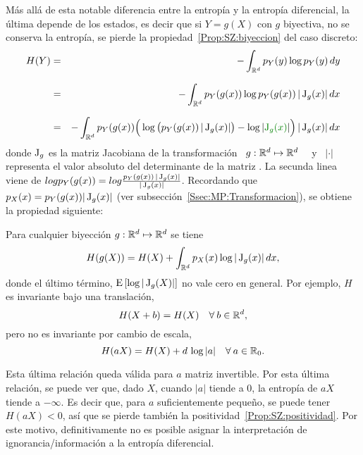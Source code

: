 M\'as  all\'a de esta  notable diferencia  entre la  entrop\'ia y  la entrop\'ia
diferencial, la \'ultima depende de los estados,  es decir que si $Y = g(X)$ con
$g$   biyectiva,   no   se   conserva   la  entrop\'ia,   \ie   se   pierde   la
propiedad~\ref{Prop:SZ:biyeccion} del caso discreto:
%
\begin{eqnarray*}
H(Y) & = & - \int_{\Rset^d} p_Y(y) \log p_Y(y) \, dy\\[2.5mm]
%
& = &  - \int_{\Rset^d} p_Y(g(x)) \log p_Y(g(x)) \, |\Jac_g(x)| \, dx\\[2.5mm]
%
& = & - \int_{\Rset^d} p_Y(g(x)) \Big( \log \big( p_Y(g(x)) \, |\Jac_g(x)| \big) -
\log |\modif{\Jac_g(x)}| \Big) \, |\Jac_g(x)| \, dx
\end{eqnarray*}
%
donde   $\operatorname{J}_g$   es   la   matriz   Jacobiana   de   la   transformaci\'on   \
$g: \mathbb{R}^d \mapsto \mathbb{R}^d$ \ \ y  \ $|\cdot|$ representa el valor absoluto del
determinante de  la matriz \modif{(ver  notaciones)}. La secunda linea  viene de
$log p_Y(g(x)) = log  \frac{p_Y(g(x)) \, |\operatorname{J}_g(x)|}{|\operatorname{J}_g(x)|}$.  Recordando
que         $p_X(x)         =        p_Y(g(x))         |\operatorname{J}_g(x)|$         (ver
subsecci\'on~\ref{Ssec:MP:Transformacion}),
se obtiene la propiedad siguiente:
%
\begin{propiedadesC}\setcounter{enumi}{\value{PropBiyeccion}}
%
\item\label{Prop:SZ:biyeccionC}
Para  cualquier biyecci\'on $g:  \mathbb{R}^d \mapsto  \mathbb{R}^d$ se tiene
  \[
  H(g(X)) = H(X) + \int_{\mathbb{R}^d} p_X(x) \log |\operatorname{J}_g(x)| \, dx,
  \]
  donde el \'ultimo t\'ermino, $\operatorname{E}\left[  \log |\operatorname{J}_g(X)| \right]$ no vale cero
  en general. Por ejemplo, $H$ es invariante bajo una translaci\'on,
  \[
  H(X+b) = H(X) \quad \forall \: b \in \mathbb{R}^d,
  \]
  pero no  es invariante  por cambio  de escala,
  \[
  H(a X) = H(X) + d \, \log |a| \quad \forall \: a \in \mathbb{R}_0.
  \]
\end{propiedadesC}
%
Esta \'ultima  relaci\'on queda v\'alida  para $a$ matriz invertible.   Por esta
\'ultima  relaci\'on, se puede  ver que,  dado $X$,  cuando $|a|$  tiende a  0, la
entrop\'ia de $a X$ tiende a  $-\infty$.  Es decir que, para $a$ suficientemente
peque\~no,  se puede  tener $H(a  X)  < 0$,  as\'i  que se  pierde tambi\'en  la
positividad~\ref{Prop:SZ:positividad}.  Por  este motivo, definitivamente  no es
posible asignar la interpretaci\'on  de ignorancia/informaci\'on a la entrop\'ia
diferencial.

